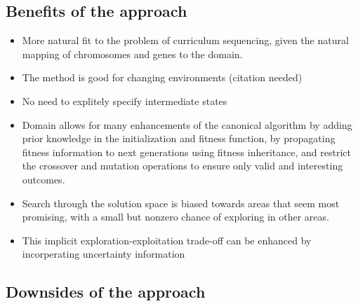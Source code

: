 \begin{itemize}
\subsection{Benefits of the approach}
\begin{itemize}
	\item More natural fit to the problem of curriculum sequencing, given the
		natural mapping of chromosomes and genes to the domain.
	\item The method is good for changing environments (citation needed)
	\item No need to explitely specify intermediate states
	\item Domain allows for many enhancements of the canonical algorithm by
		adding prior knowledge in the initialization and fitness function, by
		propagating fitness information to next generations using fitness
		inheritance, and restrict the crossover and mutation operations to
		ensure only valid and interesting outcomes.
	\item Search through the solution space is biased towards areas that seem
		most promising, with a small but nonzero chance of exploring in other
		areas.
	\item This implicit exploration-exploitation trade-off can be enhanced by
		incorperating uncertainty information
\end{itemize}
\subsection{Downsides of the approach}

\end{itemize}

